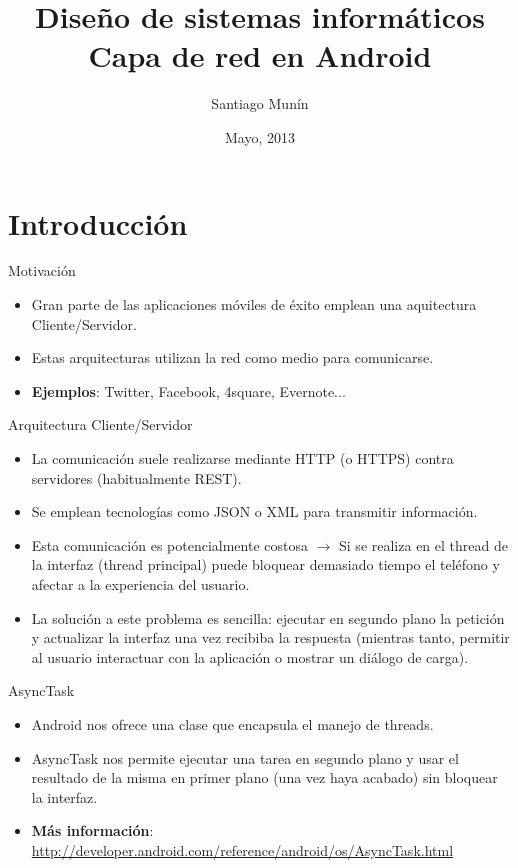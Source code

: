 \documentclass{beamer}
\title[Diseño de la capa de red en Android]{Diseño de sistemas informáticos\\Capa de red en Android}
\author{Santiago Munín}
\institute{Universidade da Coruña}
\date{Mayo, 2013}
\begin{document}
\begin{frame}
\titlepage
\end{frame}

\section{Introducción}
\begin{frame}{Motivación}
\begin{itemize}
\item Gran parte de las aplicaciones móviles de éxito emplean una aquitectura Cliente/Servidor.
\item Estas arquitecturas utilizan la red como medio para comunicarse.
\item {\bf Ejemplos}: Twitter, Facebook, 4square, Evernote...
\end{itemize}
\end{frame}

\begin{frame}{Arquitectura Cliente/Servidor}
\begin{itemize}
\item La comunicación suele realizarse mediante HTTP (o HTTPS) contra servidores (habitualmente REST).
\item Se emplean tecnologías como JSON o XML para transmitir información.
\item Esta comunicación es potencialmente costosa $\rightarrow$ Si se realiza en el thread de la interfaz (thread principal) puede bloquear demasiado tiempo el teléfono y afectar a la experiencia del usuario.
\item La solución a este problema es sencilla: ejecutar en segundo plano la petición y actualizar la interfaz una vez recibiba la respuesta (mientras tanto, permitir al usuario interactuar con la aplicación o mostrar un diálogo de carga).
\end{itemize}
\end{frame}

\begin{frame}{AsyncTask}
\begin{itemize}
\item Android nos ofrece una clase que encapsula el manejo de threads.
\item AsyncTask nos permite ejecutar una tarea en segundo plano y usar el resultado de la misma en primer plano (una vez haya acabado) sin bloquear la interfaz.
\item {\bf Más información}: \url{http://developer.android.com/reference/android/os/AsyncTask.html}
\end{itemize}
\end{frame}
\end{document}
